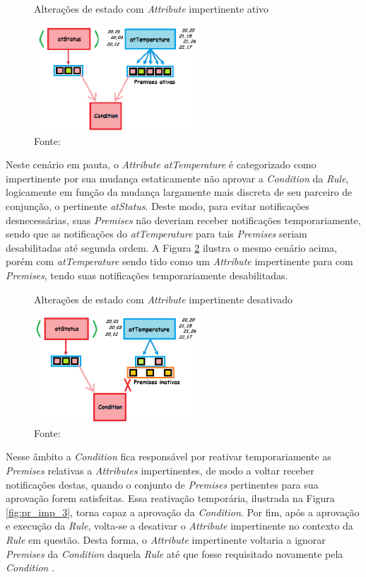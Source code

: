 \begin{figure}[!htb]
  \centering
  \caption{Alterações de estado com \textit{Attribute} impertinente ativo}
  \includegraphics[width=0.55\textwidth]{../figures/pr_imp_1.png}
  \smallskip
  \caption*{Fonte: }
  \label{fig:pr_imp_1}
\end{figure}

Neste cenário em pauta, o \textit{Attribute} \textit{atTemperature} é
categorizado como impertinente por sua mudança estaticamente não aprovar a
\textit{Condition} da \textit{Rule}, logicamente em função da mudança largamente
mais discreta de seu parceiro de conjunção, o pertinente \textit{atStatus}.
Deste modo, para evitar notificações desnecessárias, suas \textit{Premises} não
deveriam receber notificações temporariamente, sendo que as notificações do
\textit{atTemperature} para tais \textit{Premises} seriam desabilitadas até
segunda ordem. A Figura \ref{fig:pr_imp_2} ilustra o mesmo cenário acima, porém
com \textit{atTemperature} sendo tido como um \textit{Attribute} impertinente
para com \textit{Premises}, tendo suas notificações temporariamente
desabilitadas.

\begin{figure}[!htb]
  \centering
  \caption{Alterações de estado com \textit{Attribute} impertinente desativado}
  \includegraphics[width=0.55\textwidth]{../figures/pr_imp_2.png}
  \smallskip
  \caption*{Fonte: }
  \label{fig:pr_imp_2}
\end{figure}


Nesse âmbito a \textit{Condition} fica responsável por reativar temporariamente
as \textit{Premises} relativas a \textit{Attributes} impertinentes, de modo a
voltar receber notificações destas, quando o conjunto de \textit{Premises}
pertinentes para sua aprovação forem satisfeitas. Essa reativação temporária,
ilustrada na Figura \ref{fig:pr_imp_3}, torna capaz a aprovação da
\textit{Condition}. Por fim, após a aprovação e execução da \textit{Rule},
volta-se a desativar o \textit{Attribute} impertinente no contexto da
\textit{Rule} em questão. Desta forma, o \textit{Attribute} impertinente
voltaria a ignorar \textit{Premises} da \textit{Condition} daquela \textit{Rule}
até que fosse requisitado novamente pela \textit{Condition}
\cite{msc_Ronszcka_2012}.


